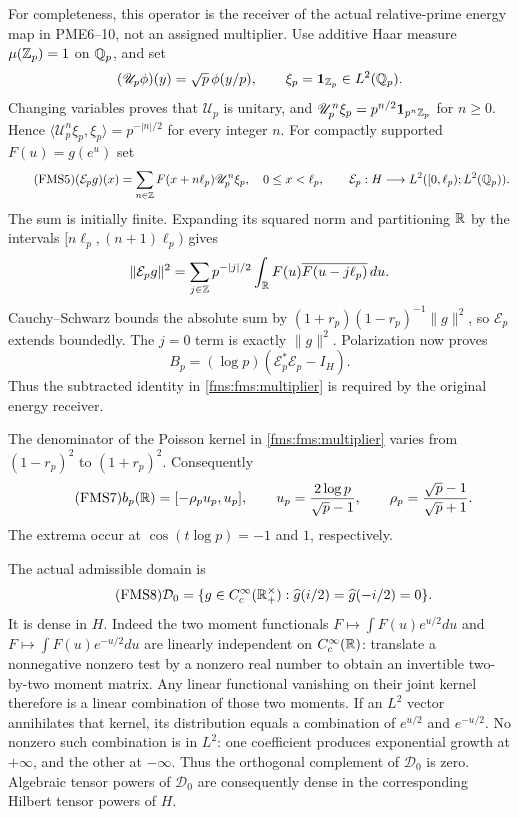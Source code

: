 For completeness, this operator is the receiver of the actual
relative-prime energy map in PME6--10, not an assigned multiplier.
Use additive Haar measure $\mu(\mathbb Z_p)=1$ on $\mathbb Q_p$, and set
\[
 (\mathscr U_p\phi)(y)=\sqrt p\,\phi(y/p),\qquad
 \xi_p=\mathbf1_{\mathbb Z_p}\in L^2(\mathbb Q_p).
\]
Changing variables proves that $\mathscr U_p$ is unitary, and
$\mathscr U_p^n\xi_p=p^{n/2}\mathbf1_{p^n\mathbb Z_p}$ for $n\ge0$.
Hence $\langle\mathscr U_p^n\xi_p,\xi_p\rangle=p^{-|n|/2}$ for
every integer $n$.  For compactly supported $F(u)=g(e^u)$ set
\begin{equation}\tag{FMS5}\label{fms:fms:energy}
 (\mathcal E_pg)(x)=\sum_{n\in\mathbb Z}F(x+n\ell_p)\mathscr U_p^n\xi_p,
 \quad 0\le x<\ell_p,\qquad
 \mathcal E_p:H\longrightarrow
 L^2([0,\ell_p);L^2(\mathbb Q_p)).
\end{equation}
The sum is initially finite. Expanding its squared norm and
partitioning $\mathbb R$ by the intervals $[n\ell_p,(n+1)\ell_p)$ gives
\[
 \|\mathcal E_pg\|^2
 =\sum_{j\in\mathbb Z}p^{-|j|/2}
       \int_\mathbb R F(u)\overline{F(u-j\ell_p)}\,du.
\]
Cauchy--Schwarz bounds the absolute sum by
$(1+r_p)(1-r_p)^{-1}\|g\|^2$, so $\mathcal E_p$ extends boundedly.
The $j=0$ term is exactly $\|g\|^2$. Polarization now proves
\begin{equation}\tag{FMS6}\label{fms:fms:energyreceiver}
 B_p=(\log p)(\mathcal E_p^*\mathcal E_p-I_H).
\end{equation}
Thus the subtracted identity in \eqref{fms:fms:multiplier} is required by
the original energy receiver.

The denominator of the Poisson kernel in \eqref{fms:fms:multiplier}
varies from $(1-r_p)^2$ to $(1+r_p)^2$.  Consequently
\begin{equation}\tag{FMS7}\label{fms:fms:localrange}
 b_p(\mathbb R)=[-\rho_pu_p,u_p],\qquad
 u_p=\frac{2\log p}{\sqrt p-1},\qquad
 \rho_p=\frac{\sqrt p-1}{\sqrt p+1}.
\end{equation}
The extrema occur at $\cos(t\log p)=-1$ and $1$, respectively.

The actual admissible domain is
\begin{equation}\tag{FMS8}\label{fms:fms:domain}
 \mathcal D_0=\{g\in C_c^\infty(\mathbb R_+^\times):
                  \widehat g(i/2)=\widehat g(-i/2)=0\}.
\end{equation}
It is dense in $H$.  Indeed the two moment functionals
$F\mapsto\int F(u)e^{u/2}du$ and
$F\mapsto\int F(u)e^{-u/2}du$ are linearly independent on
$C_c^\infty(\mathbb R)$: translate a nonnegative nonzero test by a nonzero
real number to obtain an invertible two-by-two moment matrix.
Any linear functional vanishing on their joint kernel therefore is
a linear combination of those two moments.  If an $L^2$ vector
annihilates that kernel, its distribution equals a combination of
$e^{u/2}$ and $e^{-u/2}$.  No nonzero such combination is in $L^2$:
one coefficient produces exponential growth at $+\infty$, and the
other at $-\infty$.  Thus the orthogonal complement of $\mathcal D_0$
is zero.  Algebraic tensor powers of $\mathcal D_0$ are consequently
dense in the corresponding Hilbert tensor powers of $H$.

